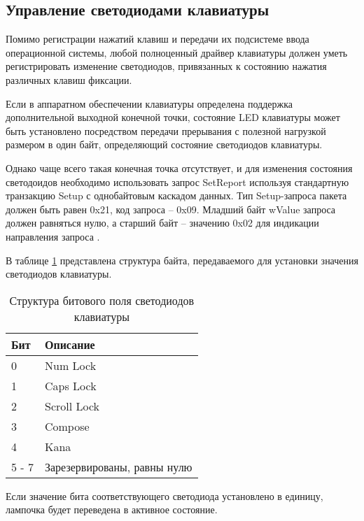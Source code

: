 \subsection{Управление светодиодами клавиатуры}

Помимо регистрации нажатий клавиш и передачи их подсистеме ввода операционной системы,
любой полноценный драйвер клавиатуры должен уметь регистрировать изменение светодиодов,
привязанных к состоянию нажатия различных клавиш фиксации.

Если в аппаратном обеспечении клавиатуры определена поддержка дополнительной выходной конечной точки,
состояние LED клавиатуры может быть установлено посредством передачи прерывания с полезной нагрузкой
размером в один байт, определяющий состояние светодиодов клавиатуры.

Однако чаще всего такая конечная точка отсутствует, и для изменения состояния светодоидов необходимо
использовать запрос SetReport используя стандартную транзакцию Setup с однобайтовым каскадом данных.
Тип Setup-запроса пакета должен быть равен 0x21, код запроса -- 0x09. Младший байт wValue запроса
должен равняться нулю, а старший байт -- значению 0x02 для индикации направления запроса \cite{osdev}.

В таблице \ref{leds} представлена структура байта, 
передаваемого для установки значения светодиодов клавиатуры.

\begin{table}[H] 
    \caption{Структура битового поля светодиодов клавиатуры}
    \begin{tabular}{| m{2cm} | m{8cm} |}
        \hline
        Бит     &  Описание                    \\
        \hline
        0       &  Num Lock                    \\
        \hline
        1       &  Caps Lock                   \\
        \hline
        2       &  Scroll Lock                 \\
        \hline
        3       &  Compose                     \\
        \hline
        4       &  Kana                        \\
        \hline
        5 - 7   &  Зарезервированы, равны нулю \\
        \hline
    \end{tabular}
    \label{leds}
\end{table}

Если значение бита соответствующего светодиода установлено в единицу, 
лампочка будет переведена в активное состояние.

